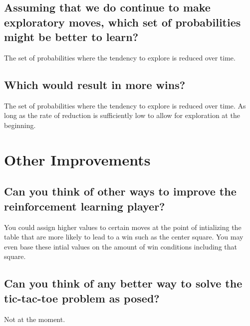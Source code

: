 \documentclass{article}
\begin{document}
\subsection{Assuming that we do continue to make exploratory moves, which set of probabilities might be better to learn?}
The set of probabilities where the tendency to explore is reduced over time.
\subsection{Which would result in more wins?}
The set of probabilities where the tendency to explore is reduced over time. As long as the rate of reduction is sufficiently low to allow for exploration at the beginning.

\section{Other Improvements}
\subsection{Can you think of other ways to improve the reinforcement learning player?}
You could assign higher values to certain moves at the point of intializing the table that are more likely to lead to a win such as the center square. You may even base these intial values on the amount of win conditions including that square.
\subsection{Can you think of any better way to solve the tic-tac-toe problem as posed?}
Not at the moment.
    
\end{document}
